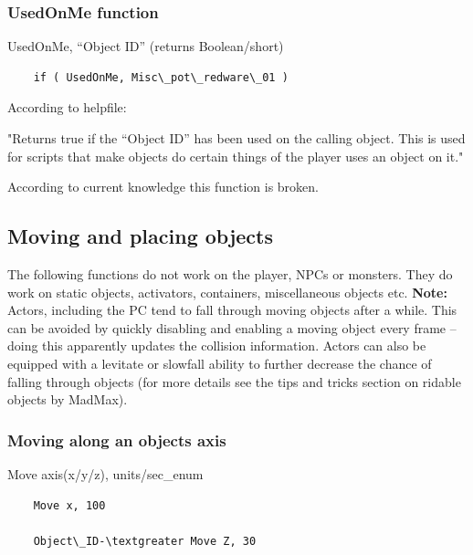 

\hypertarget{usedonme-function}{%
\subsubsection{UsedOnMe function}\label{usedonme-function}}

	UsedOnMe, ``Object ID'' (returns Boolean/short)

\begin{lstlisting}	
	if ( UsedOnMe, Misc\_pot\_redware\_01 )
\end{lstlisting}

According to helpfile:

"Returns true if the ``Object ID'' has been used on the calling object.
This is used for scripts that make objects do certain things of the
player uses an object on it."

According to current knowledge this function is broken.

\hypertarget{moving-and-placing-objects}{%
\subsection{Moving and placing
objects}\label{moving-and-placing-objects}}

The following functions do not work on the player, NPCs or monsters.
They do work on static objects, activators, containers, miscellaneous
objects etc. \textbf{Note:} Actors, including the PC tend to fall
through moving objects after a while. This can be avoided by quickly
disabling and enabling a moving object every frame -- doing this
apparently updates the collision information. Actors can also be
equipped with a levitate or slowfall ability to further decrease the
chance of falling through objects (for more details see the tips and
tricks section on ridable objects by MadMax).

\hypertarget{moving-along-an-objects-axis}{%
\subsubsection{Moving along an objects
axis}\label{moving-along-an-objects-axis}}

	Move axis(x/y/z), units/sec\_enum

\begin{lstlisting}	
	Move x, 100
	
	Object\_ID-\textgreater Move Z, 30
\end{lstlisting}

